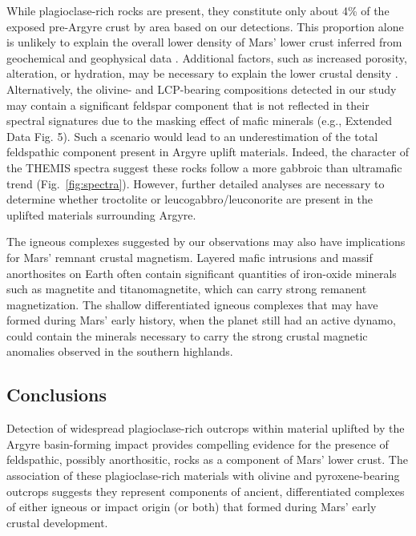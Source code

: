 \documentclass[12pt]{article}
\begin{document}
While plagioclase-rich rocks are present, they constitute only about 4\% of the exposed pre-Argyre crust by area based on our detections. This proportion alone is unlikely to explain the overall lower density of Mars' lower crust inferred from geochemical and geophysical data \citep{Baratoux2014, Goossens2017, Knapmeyer-Endrun2021, Drilleau2023, Joshi2023}. Additional factors, such as increased porosity, alteration, or hydration, may be necessary to explain the lower crustal density \citep{Ehlmann2010, Bandfield2013, Sun2015, Wordsworth2017, Goossens2017, Wieczorek2022, Carrasco2023}. Alternatively, the olivine- and LCP-bearing compositions detected in our study may contain a significant feldspar component that is not reflected in their spectral signatures due to the masking effect of mafic minerals (e.g., Extended Data Fig. 5). Such a scenario would lead to an underestimation of the total feldspathic component present in Argyre uplift materials. Indeed, the character of the THEMIS spectra suggest these rocks follow a more gabbroic than ultramafic trend (Fig.~\ref{fig:spectra}). However, further detailed analyses are necessary to determine whether troctolite or leucogabbro/leuconorite are present in the uplifted materials surrounding Argyre.

The igneous complexes suggested by our observations may also have implications for Mars' remnant crustal magnetism. Layered mafic intrusions and massif anorthosites on Earth often contain significant quantities of iron-oxide minerals such as magnetite and titanomagnetite, which can carry strong remanent magnetization. The shallow differentiated igneous complexes that may have formed during Mars' early history, when the planet still had an active dynamo, could contain the minerals necessary to carry the strong crustal magnetic anomalies observed in the southern highlands.

\subsection*{Conclusions}

Detection of widespread plagioclase-rich outcrops within material uplifted by the Argyre basin-forming impact provides compelling evidence for the presence of feldspathic, possibly anorthositic, rocks as a component of Mars' lower crust. The association of these plagioclase-rich materials with olivine and pyroxene-bearing outcrops suggests they represent components of ancient, differentiated complexes of either igneous or impact origin (or both) that formed during Mars' early crustal development.
\end{document}
